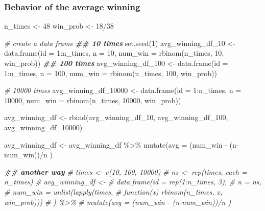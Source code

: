 \documentclass[
  ignorenonframetext,
]{beamer}
\newenvironment{Shaded}{\begin{snugshade}}{\end{snugshade}}
\newcommand{\AttributeTok}[1]{\textcolor[rgb]{0.77,0.63,0.00}{#1}}
\newcommand{\CommentTok}[1]{\textcolor[rgb]{0.56,0.35,0.01}{\textit{#1}}}
\newcommand{\DecValTok}[1]{\textcolor[rgb]{0.00,0.00,0.81}{#1}}
\newcommand{\DocumentationTok}[1]{\textcolor[rgb]{0.56,0.35,0.01}{\textbf{\textit{#1}}}}
\newcommand{\FunctionTok}[1]{\textcolor[rgb]{0.00,0.00,0.00}{#1}}
\newcommand{\NormalTok}[1]{#1}
\newcommand{\OtherTok}[1]{\textcolor[rgb]{0.56,0.35,0.01}{#1}}
\newcommand{\SpecialCharTok}[1]{\textcolor[rgb]{0.00,0.00,0.00}{#1}}
\begin{document}
\begin{frame}[fragile]
\frametitle{Behavior of the average winning}
\tiny

\begin{Shaded}
\begin{Highlighting}[]
\NormalTok{n\_times }\OtherTok{\textless{}{-}} \DecValTok{48}
\NormalTok{win\_prob }\OtherTok{\textless{}{-}} \DecValTok{18}\SpecialCharTok{/}\DecValTok{38}

\CommentTok{\# create a data frame}
\DocumentationTok{\#\# 10 times}
\FunctionTok{set.seed}\NormalTok{(}\DecValTok{1}\NormalTok{)}
\NormalTok{avg\_winning\_df\_10 }\OtherTok{\textless{}{-}}
  \FunctionTok{data.frame}\NormalTok{(}\AttributeTok{id =} \DecValTok{1}\SpecialCharTok{:}\NormalTok{n\_times,}
             \AttributeTok{n =} \DecValTok{10}\NormalTok{, }
             \AttributeTok{num\_win =} \FunctionTok{rbinom}\NormalTok{(n\_times, }\DecValTok{10}\NormalTok{, win\_prob))}
\DocumentationTok{\#\# 100 times}
\NormalTok{avg\_winning\_df\_100 }\OtherTok{\textless{}{-}} 
  \FunctionTok{data.frame}\NormalTok{(}\AttributeTok{id =} \DecValTok{1}\SpecialCharTok{:}\NormalTok{n\_times,}
             \AttributeTok{n =} \DecValTok{100}\NormalTok{, }
             \AttributeTok{num\_win =} \FunctionTok{rbinom}\NormalTok{(n\_times, }\DecValTok{100}\NormalTok{, win\_prob))}

\CommentTok{\# 10000 times}
\NormalTok{avg\_winning\_df\_10000 }\OtherTok{\textless{}{-}} 
  \FunctionTok{data.frame}\NormalTok{(}\AttributeTok{id =} \DecValTok{1}\SpecialCharTok{:}\NormalTok{n\_times, }
             \AttributeTok{n =} \DecValTok{10000}\NormalTok{, }
             \AttributeTok{num\_win =} \FunctionTok{rbinom}\NormalTok{(n\_times, }\DecValTok{10000}\NormalTok{, win\_prob))}

\NormalTok{avg\_winning\_df }\OtherTok{\textless{}{-}} \FunctionTok{rbind}\NormalTok{(avg\_winning\_df\_10, avg\_winning\_df\_100, avg\_winning\_df\_10000)}

\NormalTok{avg\_winning\_df }\OtherTok{\textless{}{-}} 
\NormalTok{  avg\_winning\_df }\SpecialCharTok{\%\textgreater{}\%}
  \FunctionTok{mutate}\NormalTok{(}\AttributeTok{avg =}\NormalTok{ (num\_win }\SpecialCharTok{{-}}\NormalTok{ (n}\SpecialCharTok{{-}}\NormalTok{num\_win))}\SpecialCharTok{/}\NormalTok{n )}

\DocumentationTok{\#\# another way}
\CommentTok{\# times \textless{}{-} c(10, 100, 10000)}
\CommentTok{\# ns \textless{}{-} rep(times, each = n\_times)}
\CommentTok{\# avg\_winning\_df \textless{}{-} }
\CommentTok{\#   data.frame(id = rep(1:n\_times, 3),}
\CommentTok{\#              n = ns,}
\CommentTok{\#              num\_win = unlist(lapply(times,}
\CommentTok{\#                                  function(x) rbinom(n\_times, x, win\_prob)))}
\CommentTok{\#              ) \%\textgreater{}\%}
\CommentTok{\#   mutate(avg = (num\_win {-} (n{-}num\_win))/n )}
\end{Highlighting}
\end{Shaded}
\end{frame}
\end{document}
